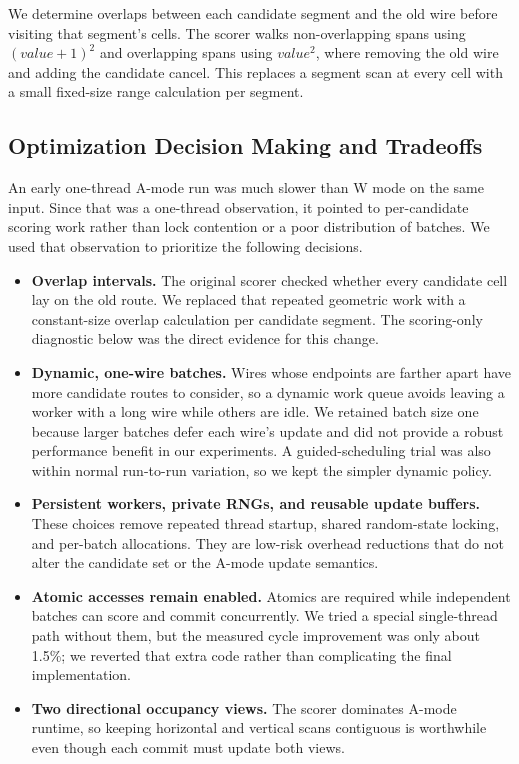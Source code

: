\documentclass[11pt]{article}
\begin{document}
We determine overlaps between each candidate segment and the old wire before
visiting that segment's cells. The scorer walks non-overlapping spans using $(value+1)^2$ and overlapping
spans using $value^2$, where removing the old wire and adding the candidate
cancel. This replaces a segment scan at every cell with a small fixed-size
range calculation per segment. 
\subsection{Optimization Decision Making and Tradeoffs}

An early one-thread A-mode run was much slower than W mode on the same input.
Since that was a one-thread observation, it pointed to per-candidate scoring
work rather than lock contention or a poor distribution of batches. We used
that observation to prioritize the following decisions.

\begin{itemize}
\item \textbf{Overlap intervals.} The original scorer checked whether every
candidate cell lay on the old route. We replaced that repeated geometric work
with a constant-size overlap calculation per candidate segment. The
scoring-only diagnostic below was the direct evidence for this change.
\item \textbf{Dynamic, one-wire batches.} Wires whose endpoints are farther
apart have more candidate routes to consider, so a dynamic work queue avoids
leaving a worker with a long wire while others are idle. We retained batch size one because larger
batches defer each wire's update and did not provide a robust performance
benefit in our experiments. A guided-scheduling trial was also within normal
run-to-run variation, so we kept the simpler dynamic policy.
\item \textbf{Persistent workers, private RNGs, and reusable update buffers.}
These choices remove repeated thread startup, shared random-state locking, and
per-batch allocations. They are low-risk overhead reductions that do not alter
the candidate set or the A-mode update semantics.
\item \textbf{Atomic accesses remain enabled.} Atomics are required while
independent batches can score and commit concurrently. We tried a special
single-thread path without them, but the measured cycle improvement was only
about 1.5\%; we reverted that extra code rather than complicating the final
implementation.
\item \textbf{Two directional occupancy views.} The scorer dominates A-mode
runtime, so keeping horizontal and vertical scans contiguous is worthwhile even
though each commit must update both views.
\end{itemize}
\end{document}
